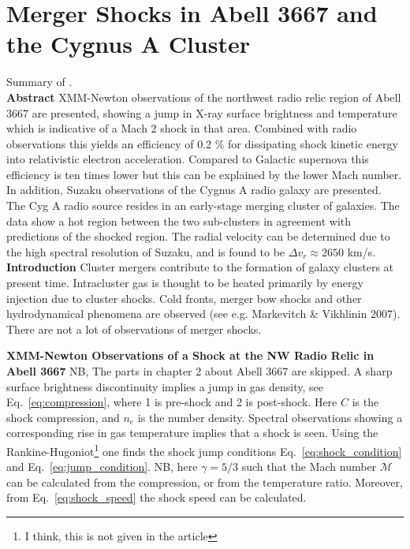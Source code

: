 \documentclass[MScProj_TLRH_ClusterEnergy.tex]{subfiles}
\begin{document}
\section*{Merger Shocks in Abell 3667 and the Cygnus A Cluster}
\label{sec:Sarazin2012}
Summary of \citet{2013AN....334..346S}.
\\
\textbf{Abstract}
XMM-Newton observations of the northwest radio relic region of Abell 3667 are presented, showing a jump in X-ray surface brightness and temperature which is indicative of a Mach 2 shock in that area. Combined with radio observations this yields an efficiency of 0.2 \% for dissipating shock kinetic energy into relativistic electron acceleration. Compared to Galactic supernova this efficiency is ten times lower but this can be explained by the lower Mach number. In addition, Suzaku observations of the Cygnus A radio galaxy are presented. The Cyg A radio source resides in an early-stage merging cluster of galaxies. The data show a hot region between the two sub-clusters in agreement with predictions of the shocked region. The radial velocity can be determined due to the high spectral resolution of Suzaku, and is found to be $\Delta v_r \approx 2650$ km/s.
\\

\textbf{Introduction}
Cluster mergers contribute to the formation of galaxy clusters at present time. Intracluster gas is thought to be heated primarily by energy injection due to cluster shocks. Cold fronts, merger bow shocks and other hydrodynamical phenomena are observed (see e.g. Markevitch \& Vikhlinin 2007). There are not a lot of observations of merger shocks.

\textbf{XMM-Newton Observations of a Shock at the NW Radio Relic in Abell 3667}
NB, The parts in chapter 2 about Abell 3667 are skipped.
A sharp surface brightness discontinuity implies a jump in gas density, see Eq.~\ref{eq:compression}, where 1 is pre-shock and 2 is post-shock. Here $C$ is the shock compression, and $n_e$ is the number density. Spectral observations showing a corresponding rise in gas temperature implies that a shock is seen. Using the Rankine-Hugoniot\footnote{I think, this is not given in the article} one finds the shock jump conditions Eq.~\ref{eq:shock_condition} and Eq.~\ref{eq:jump_condition}. NB, here $\gamma = 5/3$ such that the Mach number $\mathcal{M}$ can be calculated from the compression, or from the temperature ratio. Moreover, from Eq.~\ref{eq:shock_speed} the shock speed can be calculated.
\end{document}
